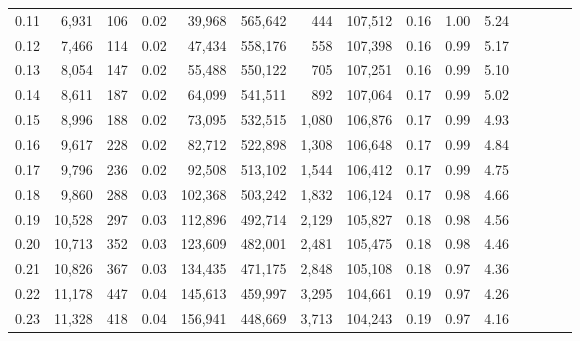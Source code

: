 \begin{tabular}{rrrcrrrrrrrrrrr}
0.11 &   6,931 &    106 &                                       0.02 &   39,968 &  565,642 &      444 &  107,512 &  0.16 &  1.00 &                         5.24 \\
0.12 &   7,466 &    114 &                                       0.02 &   47,434 &  558,176 &      558 &  107,398 &  0.16 &  0.99 &                         5.17 \\
0.13 &   8,054 &    147 &                                       0.02 &   55,488 &  550,122 &      705 &  107,251 &  0.16 &  0.99 &                         5.10 \\
0.14 &   8,611 &    187 &                                       0.02 &   64,099 &  541,511 &      892 &  107,064 &  0.17 &  0.99 &                         5.02 \\
0.15 &   8,996 &    188 &                                       0.02 &   73,095 &  532,515 &    1,080 &  106,876 &  0.17 &  0.99 &                         4.93 \\
0.16 &   9,617 &    228 &                                       0.02 &   82,712 &  522,898 &    1,308 &  106,648 &  0.17 &  0.99 &                         4.84 \\
0.17 &   9,796 &    236 &                                       0.02 &   92,508 &  513,102 &    1,544 &  106,412 &  0.17 &  0.99 &                         4.75 \\
0.18 &   9,860 &    288 &                                       0.03 &  102,368 &  503,242 &    1,832 &  106,124 &  0.17 &  0.98 &                         4.66 \\
0.19 &  10,528 &    297 &                                       0.03 &  112,896 &  492,714 &    2,129 &  105,827 &  0.18 &  0.98 &                         4.56 \\
0.20 &  10,713 &    352 &                                       0.03 &  123,609 &  482,001 &    2,481 &  105,475 &  0.18 &  0.98 &                         4.46 \\
0.21 &  10,826 &    367 &                                       0.03 &  134,435 &  471,175 &    2,848 &  105,108 &  0.18 &  0.97 &                         4.36 \\
0.22 &  11,178 &    447 &                                       0.04 &  145,613 &  459,997 &    3,295 &  104,661 &  0.19 &  0.97 &                         4.26 \\
0.23 &  11,328 &    418 &                                       0.04 &  156,941 &  448,669 &    3,713 &  104,243 &  0.19 &  0.97 &                         4.16 \\

\end{tabular}
